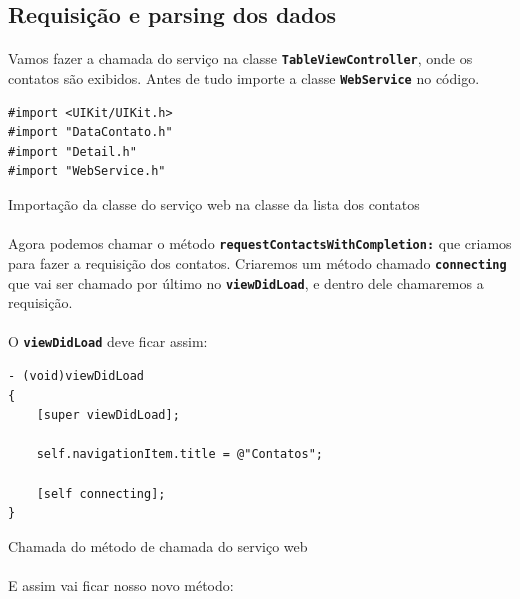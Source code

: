 \documentclass[a4paper,12pt,brazil,doubleside]{book}
\begin{document}
\begin{singlespace}
\bigskip

\subsection{Requisição e parsing dos dados}

\paragraph{}Vamos fazer a chamada do serviço na classe \texttt{\textbf{TableViewController}}, onde os contatos são exibidos. Antes de tudo importe a classe \texttt{\textbf{WebService}} no código.

\begin{listing}[H]
\begin{verbatim}
#import <UIKit/UIKit.h>
#import "DataContato.h"
#import "Detail.h"
#import "WebService.h"
\end{verbatim}
\caption{Importação da classe do serviço web na classe da lista dos contatos}
\end{listing}

\paragraph{}Agora podemos chamar o método \texttt{\textbf{requestContactsWithCompletion:}} que criamos para fazer a requisição dos contatos. Criaremos um método chamado \texttt{\textbf{connecting}} que vai ser chamado por último no \texttt{\textbf{viewDidLoad}}, e dentro dele chamaremos a requisição.
\paragraph{}O \texttt{\textbf{viewDidLoad}} deve ficar assim:

\begin{listing}[H]
\begin{verbatim}
- (void)viewDidLoad
{
    [super viewDidLoad];

    self.navigationItem.title = @"Contatos";
    
    [self connecting];
}
\end{verbatim}
\caption{Chamada do método de chamada do serviço web}
\end{listing}

\paragraph{}E assim vai ficar nosso novo método:


\end{singlespace}
\end{document}
